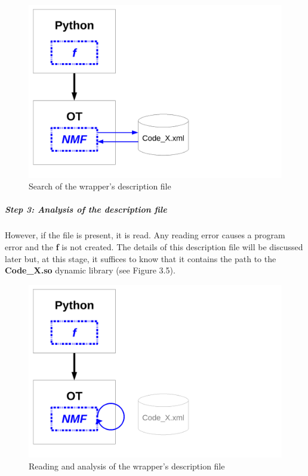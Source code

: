\begin{figure}
\begin{center}
\includegraphics[width=12cm]{Figures/wrapper/Figure4.pdf}
\caption[Figure 4]{Search of the wrapper's description file}
\end{center}
\end{figure}

\subparagraph{Step 3: Analysis of the description file}

However, if the file is present, it is read. Any reading error causes a program error and the {\bf f} is not created. The details of this description file will be discussed later but, at this stage, it suffices to know that it contains the path to the {\bf Code\_X.so} dynamic library (see Figure 3.5).

\begin{figure}
\begin{center}
\includegraphics[width=12cm]{Figures/wrapper/Figure5.pdf}
\caption[Figure 5]{Reading and analysis of the wrapper's description file}
\end{center}
\end{figure}


